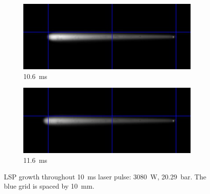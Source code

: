 \begin{figure}[h]
\begin{subfigure}[t]{0.47\textwidth}
        \end{subfigure}
        \hfill
        \begin{subfigure}[t]{0.47\textwidth}
            \centering
            \includegraphics[width=\textwidth]{assets/5 results/1msFrames/106.jpg}
            \caption{\qty{10.6}{ms}}
            \label{fig:growth_frames_106}
        \end{subfigure}
        \hfill
        \begin{subfigure}[t]{0.47\textwidth}
            \centering
            \includegraphics[width=\textwidth]{assets/5 results/1msFrames/116.jpg}
            \caption{\qty{11.6}{ms}}
            \label{fig:growth_frames_116}
        \end{subfigure}
        \caption[LSP growth throughout \qty{10}{ms} laser pulse]{LSP growth throughout \qty{10}{ms} laser pulse: \qty{3080}{W}, \qty{20.29}{bar}. The blue grid is spaced by \qty{10}{mm}.}
        \label{fig:growth_frames}
    \end{figure}